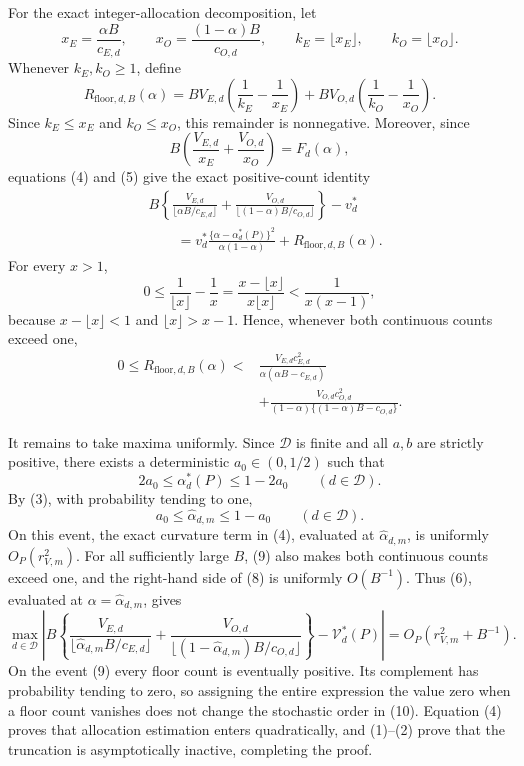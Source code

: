 For the exact integer-allocation decomposition, let
\[
 x_E=\frac{\alpha B}{c_{E,d}},\qquad
 x_O=\frac{(1-\alpha)B}{c_{O,d}},
 \qquad k_E=\lfloor x_E\rfloor,
 \qquad k_O=\lfloor x_O\rfloor.
\]
Whenever \(k_E,k_O\ge1\), define
\[
 R_{\mathrm{floor},d,B}(\alpha)
 =B V_{E,d}\left(\frac1{k_E}-\frac1{x_E}\right)
 +B V_{O,d}\left(\frac1{k_O}-\frac1{x_O}\right).                 \tag{5}
\]
Since \(k_E\le x_E\) and \(k_O\le x_O\), this remainder is nonnegative.  Moreover, since
\[
 B\left(\frac{V_{E,d}}{x_E}+\frac{V_{O,d}}{x_O}\right)
 =F_d(\alpha),
\]
equations (4) and (5) give the exact positive-count identity
\[
\begin{aligned}
 &B\left\{\frac{V_{E,d}}{\lfloor\alpha B/c_{E,d}\rfloor}
 +\frac{V_{O,d}}{\lfloor(1-\alpha)B/c_{O,d}\rfloor}\right\}
 -v_d^*\\
 &\qquad={}
 v_d^*\frac{\{\alpha-\alpha_d^*(P)\}^2}{\alpha(1-\alpha)}
 +R_{\mathrm{floor},d,B}(\alpha).                                 \tag{6}
\end{aligned}
\]
For every \(x>1\),
\[
 0\le \frac1{\lfloor x\rfloor}-\frac1x
 =\frac{x-\lfloor x\rfloor}{x\lfloor x\rfloor}
 <\frac1{x(x-1)},                                                   \tag{7}
\]
because \(x-\lfloor x\rfloor<1\) and \(\lfloor x\rfloor>x-1\).  Hence, whenever both continuous counts exceed one,
\[
\begin{aligned}
 0\le R_{\mathrm{floor},d,B}(\alpha)
 <{}&\frac{V_{E,d}c_{E,d}^2}
 {\alpha(\alpha B-c_{E,d})}\\
 &+\frac{V_{O,d}c_{O,d}^2}
 {(1-\alpha)\{(1-\alpha)B-c_{O,d}\}}.                            \tag{8}
\end{aligned}
\]

It remains to take maxima uniformly.  Since \(\mathcal D\) is finite and all \(a,b\) are strictly positive, there exists a deterministic \(a_0\in(0,1/2)\) such that
\[
 2a_0\le \alpha_d^*(P)\le1-2a_0
 \qquad(d\in\mathcal D).
\]
By (3), with probability tending to one,
\[
 a_0\le\widehat\alpha_{d,m}\le1-a_0
 \qquad(d\in\mathcal D).                                         \tag{9}
\]
On this event, the exact curvature term in (4), evaluated at \(\widehat\alpha_{d,m}\), is uniformly \(O_P(r_{V,m}^2)\).  For all sufficiently large \(B\), (9) also makes both continuous counts exceed one, and the right-hand side of (8) is uniformly \(O(B^{-1})\).  Thus (6), evaluated at \(\alpha=\widehat\alpha_{d,m}\), gives
\[
\max_{d\in\mathcal D}\left|B\left\{
\frac{V_{E,d}}{\lfloor\widehat\alpha_{d,m}B/c_{E,d}\rfloor}
+\frac{V_{O,d}}{\lfloor(1-\widehat\alpha_{d,m})B/c_{O,d}\rfloor}
\right\}-\mathcal V_d^*(P)\right|
=O_P(r_{V,m}^2+B^{-1}).                                            \tag{10}
\]
On the event (9) every floor count is eventually positive.  Its complement has probability tending to zero, so assigning the entire expression the value zero when a floor count vanishes does not change the stochastic order in (10).  Equation (4) proves that allocation estimation enters quadratically, and (1)--(2) prove that the truncation is asymptotically inactive, completing the proof.